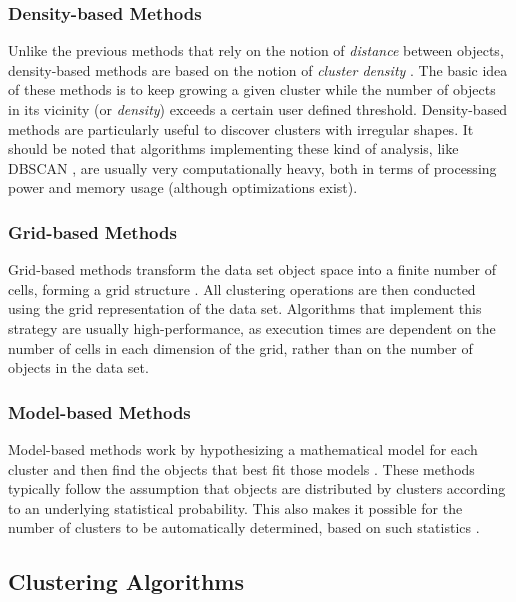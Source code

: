 \subsubsection*{Density-based Methods}

Unlike the previous methods that rely on the notion of \emph{distance} between
objects, density-based methods are based on the notion of \emph{cluster density}
\cite{han2006data}. The basic idea of these methods is to keep growing a given
cluster while the number of objects in its vicinity (or \emph{density}) exceeds
a certain user defined threshold. Density-based methods are particularly useful
to discover clusters with irregular shapes. It should be noted that algorithms
implementing these kind of analysis, like DBSCAN \cite{Ester96adensity-based},
are usually very computationally heavy, both in terms of processing power and
memory usage
(although optimizations exist).

\subsubsection*{Grid-based Methods}

Grid-based methods transform the data set object space into a finite number of
cells, forming a grid structure
\cite{han2006data,DBLP:journals/corr/abs-1205-1117}. All clustering operations
are then conducted using the grid representation of the data set. Algorithms
that implement this strategy are usually high-performance, as execution times
are dependent on the number of cells in each dimension of the grid, rather than
on the number of objects in the data set.

\subsubsection*{Model-based Methods}

Model-based methods work by hypothesizing a mathematical model for each cluster
and then find the objects that best fit those models
\cite{DBLP:journals/corr/abs-1205-1117}. These methods typically follow the
assumption that objects are distributed by clusters according to an underlying
statistical probability. This also makes it possible for the number of clusters
to be automatically determined, based on such statistics \cite{han2006data}.

\subsection{Clustering Algorithms}\label{sec:clusteralgo}

